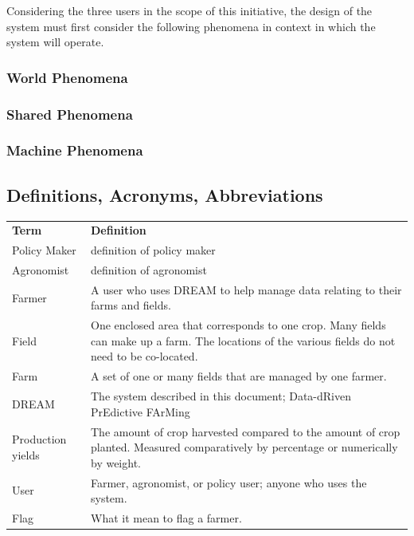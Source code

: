 \begin{flushleft} %

Considering the three users in the scope of this initiative, the design of the system must first consider the following phenomena in context in which the system will operate.


\subsubsection{World Phenomena}

\subsubsection{Shared Phenomena}

\subsubsection{Machine Phenomena}

\end{flushleft}

\subsection{Definitions, Acronyms, Abbreviations}


\begin{center}
\renewcommand{\arraystretch}{1.25}
\begin{tabular}{l >{\raggedright\arraybackslash}p{12cm} } \hline
    \textbf{Term} & \textbf{Definition}\\ 
	Policy Maker & definition of policy maker \\
	Agronomist & definition of agronomist \\
    Farmer & A user who uses DREAM to help manage data relating to their farms and fields.\\
    Field & One enclosed area that corresponds to one crop. Many fields can make up a farm. The locations of the various fields do not need to be co-located.\\
    Farm & A set of one or many fields that are managed by one farmer.\\
    DREAM & The system described in this document; Data-dRiven PrEdictive FArMing\\
    Production yields & The amount of crop harvested compared to the amount of crop planted. Measured comparatively by percentage or numerically by weight.\\
    User & Farmer, agronomist, or policy user; anyone who uses the system.\\
    Flag & What it mean to flag a farmer.\\
    \hline
\end{tabular}
\end{center}



